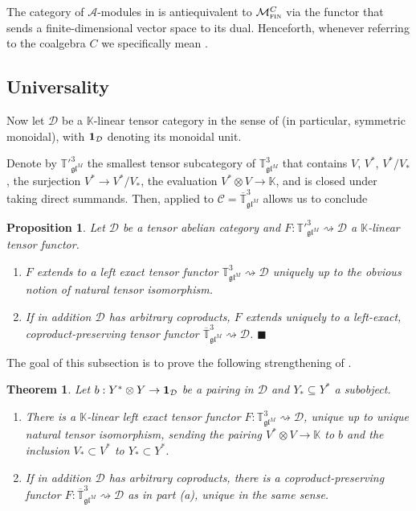 \documentclass[11pt]{article}
\theoremstyle{plain}
\newtheorem{proposition}[lemma]{Proposition}
\newtheorem{theorem}[lemma]{Theorem}
\theoremstyle{nonumberplain}
\theoremstyle{plain}
\theoremstyle{nonumberplain}
\newcommand\bK{{\mathbb K}}
\newcommand\bT{{\mathbb T}}
\newcommand\cA{{\mathcal A}}
\newcommand\cC{{\mathcal C}}
\newcommand\cD{{\mathcal D}}
\newcommand\cM{{\mathcal M}}
\newcommand\fgl{\mathfrak{gl}}
\newcommand\ol{\overline}
\newcommand{\cat}[1]{\textsc{#1}}
\newcommand{\qedhere}{\mbox{}\hfill\ensuremath{\blacksquare}}
\begin{document}
The category of $\cA$-modules in  is antiequivalent to $\cM^C_{\cat{fin}}$ via the functor that sends a finite-dimensional vector space to its dual. Henceforth, whenever referring to the coalgebra $C$ we specifically mean . 




\subsection{Universality}
\label{subsec.3d_univ}


Now let $\cD$ be a $\bK$-linear tensor category in the sense of  (in particular, symmetric monoidal), with ${\bf 1}_\cD$ denoting its monoidal unit.

Denote by $\bT'^3_{\fgl^M}$ the smallest tensor subcategory of $\bT^3_{\fgl^M}$ that contains $V$, $V^*$, $V^*/V_*$, the surjection $V^*\to V^*/V_*$, the evaluation $V^*\otimes V\to \bK$, and is closed under taking direct summands. Then,  applied to $\cC=\ol{\bT}^3_{\fgl^M}$ allows us to conclude


\begin{proposition}\label{pr.3d_univ}
Let $\cD$ be a tensor abelian category and $F:\bT'^3_{\fgl^M}\rightsquigarrow \cD$ a $\bK$-linear tensor functor. 
\begin{enumerate}
\renewcommand{\labelenumi}{(\alph{enumi})}
\item $F$ extends to a left exact tensor functor $\bT^3_{\fgl^M}\rightsquigarrow\cD$ uniquely up to the obvious notion of natural tensor isomorphism.  
\item If in addition $\cD$ has arbitrary coproducts, $F$ extends uniquely to a left-exact, coproduct-preserving tensor functor $\ol{\bT}^3_{\fgl^M}\rightsquigarrow \cD$. \qedhere
\end{enumerate}
\end{proposition}




The goal of this subsection is to prove the following strengthening of . 



\begin{theorem}\label{th.3d_univ}
Let $b:Y^*\otimes Y\to {\bf 1}_\cD$ be a pairing in $\cD$ and $Y_*\subseteq Y^*$ a subobject.  
\begin{enumerate}
\renewcommand{\labelenumi}{(\alph{enumi})}
\item There is a $\bK$-linear left exact tensor functor $F:\bT^3_{\fgl^M}\rightsquigarrow \cD$, unique up to unique natural tensor isomorphism, sending the pairing $V^*\otimes V\to \bK$ to $b$ and the inclusion $V_*\subset V^*$ to $Y_*\subset Y^*$.  
\item If in addition $\cD$ has arbitrary coproducts, there is a coproduct-preserving functor $F:\ol{\bT}^3_{\fgl^M}\rightsquigarrow \cD$ as in part (a), unique in the same sense.
\end{enumerate}
\end{theorem}
\end{document}
